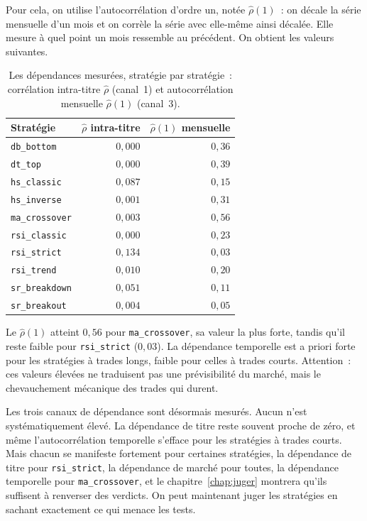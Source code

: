 Pour cela, on utilise l'autocorrélation d'ordre un, notée
$\hat\rho(1)$~: on décale la série mensuelle d'un mois et on corrèle la
série avec elle-même ainsi décalée. Elle mesure à quel point un mois
ressemble au précédent. On obtient les valeurs suivantes.

\begin{table}[H]
\centering
\caption{Les dépendances mesurées, stratégie par stratégie~:
corrélation intra-titre $\hat\rho$ (canal~1) et autocorrélation
mensuelle $\hat\rho(1)$ (canal~3).}
\label{tab:dep-mesures}
\small
\begin{tabular}{@{}lrr@{}}
\toprule
Stratégie & $\hat\rho$ intra-titre & $\hat\rho(1)$ mensuelle \\
\midrule
\texttt{db\_bottom}    & $0{,}000$ & $0{,}36$ \\
\texttt{dt\_top}       & $0{,}000$ & $0{,}39$ \\
\texttt{hs\_classic}   & $0{,}087$ & $0{,}15$ \\
\texttt{hs\_inverse}   & $0{,}001$ & $0{,}31$ \\
\texttt{ma\_crossover} & $0{,}003$ & $0{,}56$ \\
\texttt{rsi\_classic}  & $0{,}000$ & $0{,}23$ \\
\texttt{rsi\_strict}   & $0{,}134$ & $0{,}03$ \\
\texttt{rsi\_trend}    & $0{,}010$ & $0{,}20$ \\
\texttt{sr\_breakdown} & $0{,}051$ & $0{,}11$ \\
\texttt{sr\_breakout}  & $0{,}004$ & $0{,}05$ \\
\bottomrule
\end{tabular}
\end{table}

Le $\hat\rho(1)$ atteint $0{,}56$ pour \texttt{ma\_crossover}, sa valeur
la plus forte, tandis qu'il reste faible pour \texttt{rsi\_strict}
($0{,}03$). La dépendance temporelle est a priori forte pour les
stratégies à trades longs, faible pour celles à trades courts.
Attention~: ces valeurs élevées ne traduisent pas une prévisibilité du
marché, mais le chevauchement mécanique des trades qui durent.

Les trois canaux de dépendance sont désormais mesurés. Aucun n'est
systématiquement élevé. La dépendance de titre reste souvent proche de
zéro, et même l'autocorrélation temporelle s'efface pour les stratégies
à trades courts. Mais chacun se manifeste fortement pour certaines
stratégies, la dépendance de titre pour \texttt{rsi\_strict}, la
dépendance de marché pour toutes, la dépendance temporelle pour
\texttt{ma\_crossover}, et le chapitre~\ref{chap:juger} montrera qu'ils
suffisent à renverser des verdicts. On peut maintenant juger les
stratégies en sachant exactement ce qui menace les tests.
